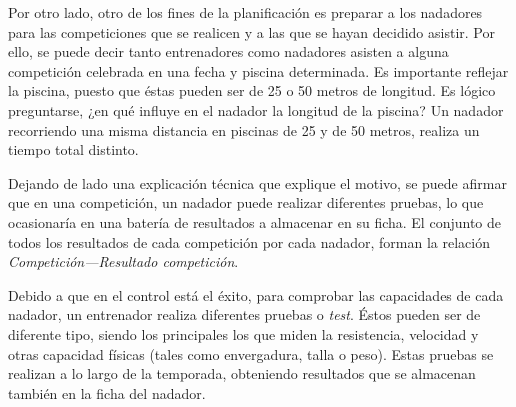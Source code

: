	Por otro lado, otro de los fines de la planificación es preparar a los nadadores para las competiciones que se realicen y a las que se hayan decidido asistir. Por ello, se puede decir tanto entrenadores como nadadores asisten a alguna competición celebrada en una fecha y piscina determinada. Es importante reflejar la piscina, puesto que éstas pueden ser de 25 o 50 metros de longitud. Es lógico preguntarse, ¿en qué influye en el nadador la longitud de la piscina? Un nadador recorriendo una misma distancia en piscinas de 25 y de 50 metros, realiza un tiempo total distinto. 
	
	Dejando de lado una explicación técnica que explique el motivo, se puede afirmar que en una competición, un nadador puede realizar diferentes pruebas, lo que ocasionaría en una batería de resultados a almacenar en su ficha. El conjunto de todos los resultados de cada competición por cada nadador, forman la relación {\it Competición---Resultado competición}.
	
	Debido a que en el control está el éxito, para comprobar las capacidades de cada nadador, un entrenador realiza diferentes pruebas o {\it test}. Éstos pueden ser de diferente tipo, siendo los principales los que miden la resistencia, velocidad y otras capacidad físicas (tales como envergadura, talla o peso). Estas pruebas se realizan a lo largo de la temporada, obteniendo resultados que se almacenan también en la ficha del nadador.
	
	    


	



